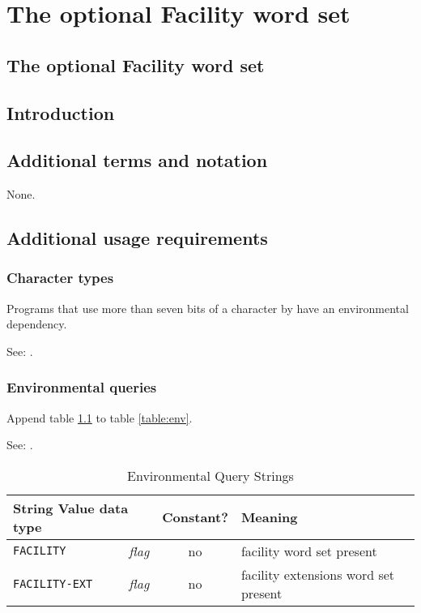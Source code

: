\chapter{The optional Facility word set} %

\begin{info}
\section{The optional Facility word set}
\end{info}

\section{Introduction} %

\section{Additional terms and notation} %
None.

\section{Additional usage requirements} %

\subsection{Character types} %
Programs that use more than seven bits of a character by
 have an environmental dependency.

See: .

\subsection{Environmental queries} %
Append table \ref{facility:env} to table \ref{table:env}.

See: .

\begin{table}[h]
  \begin{center}
	\caption{Environmental Query Strings}
	\label{facility:env}
	\begin{tabular}{p{9em}rcp{}}
		\hline\hline
		\multicolumn{2}{l}{String \hfill Value data type} & Constant? & Meaning \\
		\hline
		\texttt{FACILITY}		& \emph{flag}	& no	&
			facility word set present \\
		\texttt{FACILITY-EXT}	& \emph{flag}	& no	&
			facility extensions word set present \\
		\hline\hline
	\end{tabular}
  \end{center}
\end{table}

